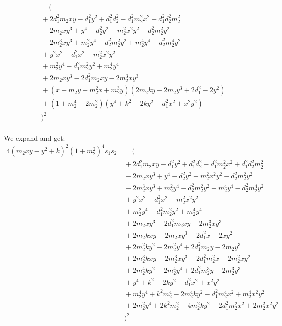\begin{align*}
  &= (\\
  & ~+ 2 d_1^2 m_2 x y - d_1^2 y^2 + d_1^2 d_2^2 - d_1^2 m_2^2 x^2 + d_1^2 d_2^2 m_2^2\\
  & ~- 2 m_2 x y^3 + y^4 - d_2^2 y^2 + m_2^2 x^2 y^2 - d_2^2 m_2^2y^2\\
  & ~- 2 m_2^3 x y^3 + m_2^2 y^4 - d_2^2 m_2^2 y^2 + m_2^4 y^4 - d_2^2 m_2^4 y^2\\
  & ~+ y^2 x^2 - d_1^2 x^2 + m_2^2 x^2 y^2\\
  & ~+ m_2^2 y^4 - d_1^2 m_2^2 y^2 + m_2^4 y^4\\
  & ~+ 2 m_2 x y^3 - 2 d_1^2 m_2 x y - 2 m_2^3 x y^3\\
  & ~+ (x + m_2 y + m_2^2 x + m_2^3 y) (2 m_2 k y - 2 m_2 y^3 + 2 d_1^2 - 2 y^2)\\
  & ~+ (1 + m_2^4 + 2 m_2^2) (y^4 + k^2 - 2 k y^2 - d_1^2 x^2 + x^2 y^2)\\
  & ~)^2\\
\end{align*}

\noindent
We expand and get:
\begin{align*}
  4 (m_2 x y - y^2 + k)^2 (1 + m_2^2)^4 s_1 s_2
  &= (\\
  & ~+ 2 d_1^2 m_2 x y - d_1^2 y^2 + d_1^2 d_2^2 - d_1^2 m_2^2 x^2 + d_1^2 d_2^2 m_2^2\\
  & ~- 2 m_2 x y^3 + y^4 - d_2^2 y^2 + m_2^2 x^2 y^2 - d_2^2 m_2^2y^2\\
  & ~- 2 m_2^3 x y^3 + m_2^2 y^4 - d_2^2 m_2^2 y^2 + m_2^4 y^4 - d_2^2 m_2^4 y^2\\
  & ~+ y^2 x^2 - d_1^2 x^2 + m_2^2 x^2 y^2\\
  & ~+ m_2^2 y^4 - d_1^2 m_2^2 y^2 + m_2^4 y^4\\
  & ~+ 2 m_2 x y^3 - 2 d_1^2 m_2 x y - 2 m_2^3 x y^3\\
  & ~+ 2 m_2 k x y - 2 m_2 x y^3 + 2 d_1^2 x - 2 x y^2\\
  & ~+ 2 m_2^2 k y^2 - 2 m_2^2 y^4 + 2 d_1^2 m_2 y - 2 m_2 y^3\\
  & ~+ 2 m_2^3 k x y - 2 m_2^3 x y^3 + 2 d_1^2 m_2^2 x - 2 m_2^2 x y^2\\
  & ~+ 2 m_2^4 k y^2 - 2 m_2^4 y^4 + 2 d_1^2 m_2^3 y - 2 m_2^3 y^3\\
  & ~+ y^4 + k^2 - 2 k y^2 - d_1^2 x^2 + x^2 y^2\\
  & ~+ m_2^4 y^4 + k^2 m_2^4 - 2 m_2^4 k y^2 - d_1^2 m_2^4 x^2 + m_2^4 x^2 y^2\\
  & ~+ 2 m_2^2 y^4 + 2 k^2 m_2^2 - 4 m_2^2 k y^2 - 2 d_1^2 m_2^2 x^2 + 2 m_2^2 x^2 y^2\\
  & ~)^2
\end{align*}

